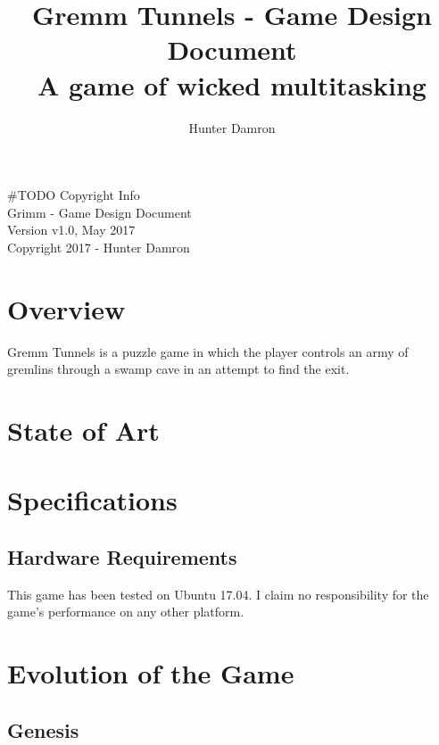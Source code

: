 \documentclass{scrreprt}
\title{
	Gremm Tunnels - Game Design Document \\
    \large A game of wicked multitasking
}
\author{Hunter Damron}
\begin{document}
	\maketitle
	
	\null\vfill
	\noindent
	\#TODO Copyright Info \\
	Grimm - Game Design Document \\ 
	Version v1.0, May 2017 \\
	Copyright 2017 - Hunter Damron \\
	\newpage

	\tableofcontents
	\newpage
	
	\chapter{Overview}
		Gremm Tunnels is a puzzle game in which the player controls an army of gremlins through a swamp cave in an attempt to find the exit. 
	
	\chapter{State of Art}
	
	\chapter{Specifications}
	
		\section{Hardware Requirements}
			This game has been tested on Ubuntu 17.04. I claim no responsibility for the game's performance on any other platform.
	
	\chapter{Evolution of the Game}
		
		\section{Genesis}
			
\end{document}
